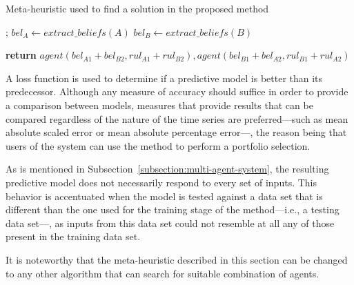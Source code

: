 \documentclass{ieeeaccess}
\begin{document}
\begin{algorithm}
\caption{Meta-heuristic used to find a solution in the proposed method}
    \label{algorithm:meta-heuristic}
\begin{algorithmic}[1]
    ;
    \State $bel_A\gets extract\_beliefs(A)$
    \State $bel_B\gets extract\_beliefs(B)$

    \State \textbf{return} $agent(bel_{A1} + bel_{B2}, rul_{A1} + rul_{B2}),
    agent(bel_{B1} + bel_{A2}, rul_{B1} + rul_{A2})$
    \EndProcedure
\end{algorithmic}
\end{algorithm}

A loss function is used to determine if a predictive model is better than
its predecessor. Although any measure of accuracy should suffice in order to provide a
comparison between models, measures that provide results that can be compared
regardless of the nature of the time series are preferred---such as mean
absolute scaled error or mean absolute percentage error---, the reason being that
users of the system can use the method to perform a portfolio selection.

As is mentioned in Subsection~\ref{subsection:multi-agent-system}, the
resulting predictive model does not necessarily respond to every set of
inputs. This behavior is accentuated when the model is tested against a data
set that is different than the one used for the training stage of the
method---i.e., a testing data set---, as inputs from this data set could not
resemble at all any of those present in the training data set.

It is noteworthy that the meta-heuristic described in this section can be
changed to any other algorithm that can search for suitable combination of
agents.

\end{document}
